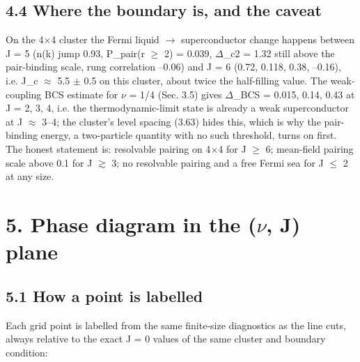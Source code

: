 \documentclass[10pt]{article}
\begin{document}
\subsection*{4.4 Where the boundary is, and the caveat}

On the 4$\times$4 cluster the Fermi liquid $\to$ superconductor change happens between J = 5 (n(k) jump 0.93, P\_pair(r $\ge$ 2) = 0.039, $\Delta$\_c2 = 1.32 still above the pair-binding scale, rung correlation --0.06) and J = 6 (0.72, 0.118, 0.38, --0.16), i.e. J\_c $\approx$ 5.5 $\pm$ 0.5 on this cluster, about twice the half-filling value. The weak-coupling BCS estimate for $\nu$ = 1/4 (Sec. 3.5) gives $\Delta$\_BCS = 0.015, 0.14, 0.43 at J = 2, 3, 4, i.e. the thermodynamic-limit state is already a weak superconductor at J $\approx$ 3--4; the cluster's level spacing (3.63) hides this, which is why the pair-binding energy, a two-particle quantity with no such threshold, turns on first. The honest statement is: resolvable pairing on 4$\times$4 for J $\ge$ 6; mean-field pairing scale above 0.1 for J $\gtrsim$ 3; no resolvable pairing and a free Fermi sea for J $\le$ 2 at any size.

\section*{5. Phase diagram in the ($\nu$, J) plane}

\subsection*{5.1 How a point is labelled}

Each grid point is labelled from the same finite-size diagnostics as the line cuts, always relative to the exact J = 0 values of the same cluster and boundary condition:
\end{document}
